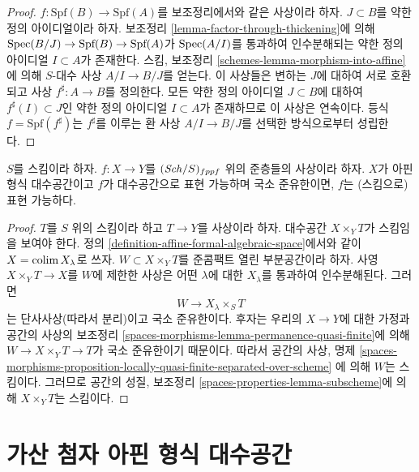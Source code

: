 \begin{proof}
$f : \text{Spf}(B) \to \text{Spf}(A)$를 보조정리에서와 같은
사상이라 하자. $J \subset B$를 약한 정의 아이디얼이라 하자.
보조정리 \ref{lemma-factor-through-thickening}에 의해
$\mathop{\mathrm{Spec}}(B/J) \to \text{Spf}(B) \to \text{Spf}(A)$가
$\mathop{\mathrm{Spec}}(A/I)$를 통과하여 인수분해되는 약한 정의 아이디얼
$I \subset A$가 존재한다. 스킴, 보조정리
\ref{schemes-lemma-morphism-into-affine}에 의해 $S$-대수 사상
$A/I \to B/J$를 얻는다. 이 사상들은 변하는 $J$에 대하여 서로
호환되고 사상 $f^\sharp : A \to B$를 정의한다. 모든 약한 정의
아이디얼 $J \subset B$에 대하여 $f^\sharp(I) \subset J$인 약한 정의
아이디얼 $I \subset A$가 존재하므로 이 사상은 연속이다. 등식
$f = \text{Spf}(f^\sharp)$는 $f^\sharp$를 이루는 환 사상
$A/I \to B/J$를 선택한 방식으로부터 성립한다.
\end{proof}

\begin{lemma}
\label{lemma-presentation-representable}
$S$를 스킴이라 하자. $f : X \to Y$를 $(\mathit{Sch}/S)_{fppf}$ 위의
준층들의 사상이라 하자. $X$가 아핀 형식 대수공간이고 $f$가
대수공간으로 표현 가능하며 국소 준유한이면, $f$는 (스킴으로)
표현 가능하다.
\end{lemma}

\begin{proof}
$T$를 $S$ 위의 스킴이라 하고 $T \to Y$를 사상이라 하자. 대수공간
$X \times_Y T$가 스킴임을 보여야 한다. 정의
\ref{definition-affine-formal-algebraic-space}에서와 같이
$X = \mathop{\mathrm{colim}}\nolimits X_\lambda$로 쓰자. $W \subset X \times_Y T$를 준콤팩트
열린 부분공간이라 하자. 사영 $X \times_Y T \to X$를 $W$에 제한한
사상은 어떤 $\lambda$에 대한 $X_\lambda$를 통과하여 인수분해된다.
그러면
$$
W \to X_\lambda \times_S T
$$
는 단사사상(따라서 분리)이고 국소 준유한이다. 후자는 우리의
$X \to Y$에 대한 가정과 공간의 사상의 보조정리
\ref{spaces-morphisms-lemma-permanence-quasi-finite}에 의해
$W \to X \times_Y T \to T$가 국소 준유한이기 때문이다. 따라서
공간의 사상, 명제
\ref{spaces-morphisms-proposition-locally-quasi-finite-separated-over-scheme}
에 의해 $W$는 스킴이다. 그러므로 공간의 성질, 보조정리
\ref{spaces-properties-lemma-subscheme}에 의해 $X \times_Y T$는 스킴이다.
\end{proof}






\section{가산 첨자 아핀 형식 대수공간}
\label{section-countably-indexed}

